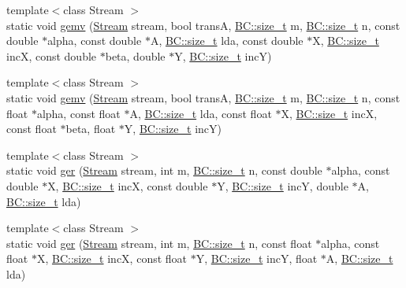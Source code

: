 \begin{DoxyCompactItemize}
\item 
{\footnotesize template$<$class Stream $>$ }\\static void \hyperlink{structBC_1_1blas_1_1BLAS_3_01host__tag_01_4_a930fdb370d30d9e0343639750afd32ca}{gemv} (\hyperlink{namespaceBC_abc64a63cd29a22d102a68f478dfd588d}{Stream} stream, bool transA, \hyperlink{namespaceBC_a6007cbc4eeec401a037b558910a56173}{B\+C\+::size\+\_\+t} m, \hyperlink{namespaceBC_a6007cbc4eeec401a037b558910a56173}{B\+C\+::size\+\_\+t} n, const double $\ast$alpha, const double $\ast$A, \hyperlink{namespaceBC_a6007cbc4eeec401a037b558910a56173}{B\+C\+::size\+\_\+t} lda, const double $\ast$X, \hyperlink{namespaceBC_a6007cbc4eeec401a037b558910a56173}{B\+C\+::size\+\_\+t} incX, const double $\ast$beta, double $\ast$Y, \hyperlink{namespaceBC_a6007cbc4eeec401a037b558910a56173}{B\+C\+::size\+\_\+t} incY)
\item 
{\footnotesize template$<$class Stream $>$ }\\static void \hyperlink{structBC_1_1blas_1_1BLAS_3_01host__tag_01_4_a7dd56f6e265c4160dafedd3eaeee638c}{gemv} (\hyperlink{namespaceBC_abc64a63cd29a22d102a68f478dfd588d}{Stream} stream, bool transA, \hyperlink{namespaceBC_a6007cbc4eeec401a037b558910a56173}{B\+C\+::size\+\_\+t} m, \hyperlink{namespaceBC_a6007cbc4eeec401a037b558910a56173}{B\+C\+::size\+\_\+t} n, const float $\ast$alpha, const float $\ast$A, \hyperlink{namespaceBC_a6007cbc4eeec401a037b558910a56173}{B\+C\+::size\+\_\+t} lda, const float $\ast$X, \hyperlink{namespaceBC_a6007cbc4eeec401a037b558910a56173}{B\+C\+::size\+\_\+t} incX, const float $\ast$beta, float $\ast$Y, \hyperlink{namespaceBC_a6007cbc4eeec401a037b558910a56173}{B\+C\+::size\+\_\+t} incY)
\item 
{\footnotesize template$<$class Stream $>$ }\\static void \hyperlink{structBC_1_1blas_1_1BLAS_3_01host__tag_01_4_a6c8434c7ba576265d3d04ae48c55e6bc}{ger} (\hyperlink{namespaceBC_abc64a63cd29a22d102a68f478dfd588d}{Stream} stream, int m, \hyperlink{namespaceBC_a6007cbc4eeec401a037b558910a56173}{B\+C\+::size\+\_\+t} n, const double $\ast$alpha, const double $\ast$X, \hyperlink{namespaceBC_a6007cbc4eeec401a037b558910a56173}{B\+C\+::size\+\_\+t} incX, const double $\ast$Y, \hyperlink{namespaceBC_a6007cbc4eeec401a037b558910a56173}{B\+C\+::size\+\_\+t} incY, double $\ast$A, \hyperlink{namespaceBC_a6007cbc4eeec401a037b558910a56173}{B\+C\+::size\+\_\+t} lda)
\item 
{\footnotesize template$<$class Stream $>$ }\\static void \hyperlink{structBC_1_1blas_1_1BLAS_3_01host__tag_01_4_aa7a5eea6314db38d2600af97e09c5c1b}{ger} (\hyperlink{namespaceBC_abc64a63cd29a22d102a68f478dfd588d}{Stream} stream, int m, \hyperlink{namespaceBC_a6007cbc4eeec401a037b558910a56173}{B\+C\+::size\+\_\+t} n, const float $\ast$alpha, const float $\ast$X, \hyperlink{namespaceBC_a6007cbc4eeec401a037b558910a56173}{B\+C\+::size\+\_\+t} incX, const float $\ast$Y, \hyperlink{namespaceBC_a6007cbc4eeec401a037b558910a56173}{B\+C\+::size\+\_\+t} incY, float $\ast$A, \hyperlink{namespaceBC_a6007cbc4eeec401a037b558910a56173}{B\+C\+::size\+\_\+t} lda)
\end{DoxyCompactItemize}


